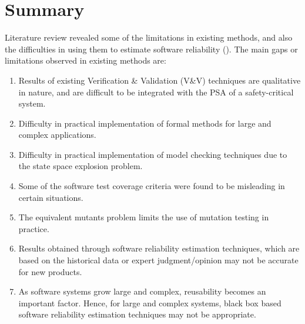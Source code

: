 \section{Summary}
Literature review revealed some of the limitations in existing methods, and also the difficulties in using them to estimate software reliability (\emph{}). The main gaps or limitations observed in existing methods are:
\begin{enumerate}
\item Results of existing Verification \& Validation (V\&V) techniques are qualitative in nature, and are difficult to be integrated with the \ac{PSA} of a safety-critical system.
\item Difficulty in practical implementation of formal methods for large and complex applications.
\item Difficulty in practical implementation of model checking techniques due to the state space explosion problem.
\item Some of the software test coverage criteria were found to be misleading in certain situations.
\item The equivalent mutants problem limits the use of mutation testing in practice.
\item Results obtained through software reliability estimation techniques, which are based on the historical data or expert judgment/opinion may not be accurate for new products.
\item As software systems grow large and complex, reusability becomes an important factor. Hence, for large and complex systems, black box based software reliability estimation techniques may not be appropriate.
\end{enumerate}
\ifx\mythesis\undefined
\Clearpage
\fi